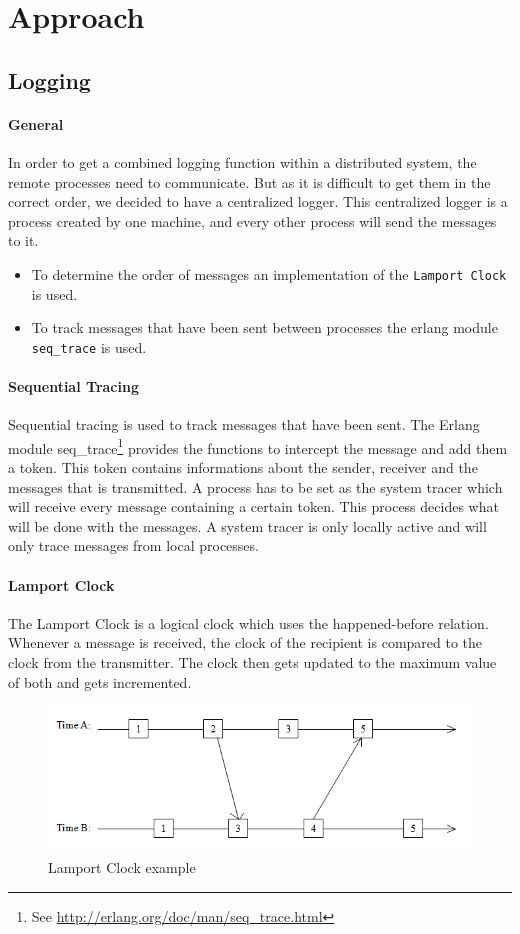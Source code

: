 \documentclass[10pt,a4wide]{article}
\begin{document}
\section{Approach}
\subsection{Logging}
\paragraph{General}
In order to get a combined logging function within a distributed system, the remote processes need to communicate. But as it is difficult to get them in the correct order, we decided to have a centralized logger.
This centralized logger is a process created by one machine, and every other process will send the messages to it. 
\begin{itemize}
\itemsep0em 
\item To determine the order of messages an implementation of the \texttt{Lamport Clock} is used.
\item To track messages that have been sent between processes the erlang module \texttt{seq\_trace} is used.
\end{itemize}

\paragraph{Sequential Tracing}
Sequential tracing is used to track messages that have been sent.
The Erlang module seq\_trace\footnote{See \url{http://erlang.org/doc/man/seq\_trace.html}} provides the functions to intercept the message and add them a token. This token contains informations about the sender, receiver and the messages that is transmitted.
A process has to be set as the system tracer which will receive every message containing a certain token. This process decides what will be done with the messages.
A system tracer is only locally active and will only trace messages from local processes.

\paragraph{Lamport Clock}
The Lamport Clock is a logical clock which uses the happened-before relation. Whenever a message is received, the clock of the recipient is compared to the clock from the transmitter. The clock then gets updated to the maximum value of both and gets incremented.
\begin{figure}[!htb]
\includegraphics[scale=0.6]{png/lamport_clock.png} 
\centering
\caption{Lamport Clock example}
\end{figure}
\end{document}
